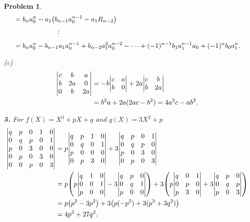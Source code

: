\documentclass{article}
\newcommand{\subno}[1]{\par\noindent\textbf{#1}}
\theoremstyle{pprop}
\newtheorem{problem}{Problem}[section]
\begin{document}
\begin{problem}
\begin{align*}
    & = b_n a_0^n - a_1 \qty(b_{n-1} a_0^{n-1} - a_1R_{n-2}) \\
    & \kern15ex \vdots \\ 
    & = b_n a_0^n - b_{n-1} a_1 a_0^{n-1} + b_{n-2} a_1^2 a_0^{n-2} - \cdots + (-1)^{n-1} b_1 a_1^{n-1} a_0 + (-1)^{n} b_0 a_1^n.
\end{align*}
\par\noindent(c)
\begin{align*}
  \mqty|
  c  & b  & a   \\
  b  & 2a & 0   \\
  0  & b  & 2a  \\
  |
  & =- b 
  \mqty|
  c   & a   \\
  b   & 0   \\
  | + 
  2a
  \mqty|
  c  & b     \\
  b  & 2a    \\
  |  \\
  & =  b^2 a + 2a (2ac-b^2) =4a^2c- ab^2.
\end{align*}
\subno{5.}
For $f(X)=X^3+pX+q$ and $g(X)=3X^2+p$
\begin{align*}
  \mqty|
  q & p & 0 & 1 & 0 \\
  0 & q & p & 0 & 1 \\
  p & 0 & 3 & 0 & 0 \\
  0 & p & 0 & 3 & 0 \\
  0 & 0 & p & 0 & 3 \\
  |
  & = p
  \mqty|
  q & p & 1 & 0 \\
  0 & q & 0 & 1 \\
  p & 0 & 0 & 0 \\
  0 & p & 3 & 0 \\
  |
  + 3
  \mqty|
  q & p & 0 & 1 \\
  0 & q & p & 0 \\
  p & 0 & 3 & 0 \\
  0 & p & 0 & 3 \\
  | \\
 & = p 
 \qty(
  p
    \mqty|
  q & 1 & 0 \\
  0 & 0 & 1 \\
  p & 0 & 0 \\
  |
  - 3
  \mqty|
  q & p & 0 \\
  0 & q & 1 \\
  p & 0 & 0 \\
  |
 ) 
 + 3 \qty(
  p
    \mqty|
  q & 0 & 1 \\
  0 & p & 0 \\
  p & 3 & 0 \\
  |
  +3 
    \mqty|
  q & p & 0  \\
  0 & q & p  \\
  p & 0 & 3  \\
  |
 )  \\
 & =
 p 
 \qty(
  p^2
  - 3
  p^2
 ) 
 + 3 \qty(
  p
    (-p^2)
  +3 
  (p^3+3q^2)
 ) \\
 & = 4p^3 + 27 q^2.
\end{align*}


\end{problem}
\end{document}
